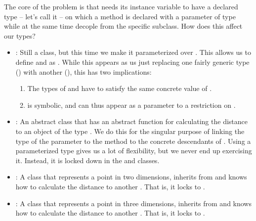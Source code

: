 The core of the problem is that  needs its  instance variable to have a declared type -- let's call it  -- on which a  method is declared with a parameter of type  while at the same time decople  from the specific  subclass. How does this affect our types?
\begin{itemize}
  \item {}: Still a class, but this time we make it parameterized over . This allows us to define  and  as . While this appears as us just replacing one fairly generic type () with another (), this has two implications:
    \begin{enumerate}
      \item The types of  and  have to satisfy the same concrete value of .
      \item {} is symbolic, and can thus appear as a parameter to a restriction on .
    \end{enumerate}
  \item {}: An abstract class that has an abstract function for calculating the distance to an object of the type . We do this for the singular purpose of linking the type of the parameter to the  method to the concrete descendants of . Using a parameterized type gives us a lot of flexibility, but we never end up exercising it. Instead, it is locked down in the  and  classes.
  \item {}: A class that represents a point in two dimensions, inherits from  and knows how to calculate the distance to another . That is, it locks  to .
  \item {}: A class that represents a point in three dimensions, inherits from  and knows how to calculate the distance to another . That is, it locks  to .
\end{itemize}

